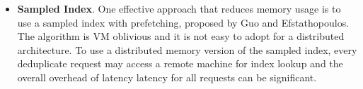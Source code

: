 \begin{itemize}
\item {\bf Sampled Index}.
One effective approach that reduces memory usage is 
to use a sampled index with prefetching, proposed  by Guo and Efstathopoulos\cite{Guo2011}. 
The algorithm is VM oblivious and it is not easy  to adopt for a distributed architecture. 
To use a distributed memory version of the sampled index, every deduplicate request
may access a remote machine for index lookup and the overall overhead of latency latency for all requests
can be significant.  




\end{itemize}

